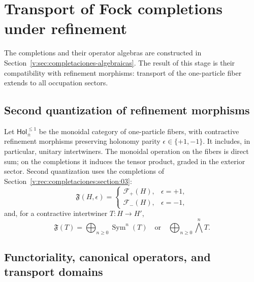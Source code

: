 \section{Transport of Fock completions under refinement}
\label{v:rec:fock_gibbs:section:01}

The completions and their operator algebras are constructed in
Section~\ref{v:sec:completaciones-algebraicas}. The result of this stage
is their compatibility with refinement morphisms: transport of
the one-particle fiber extends to all occupation sectors.

\subsection{Second quantization of refinement morphisms}
\label{v:rec:fock_gibbs:section:02}

Let \(\mathsf{Hol}_{\pm}^{\leq1}\) be the monoidal category of one-particle
fibers, with contractive refinement morphisms preserving
holonomy parity \(\epsilon\in\{+1,-1\}\). It includes, in particular,
unitary intertwiners. The monoidal operation on the fibers is
direct sum; on the completions it induces the tensor product,
graded in the exterior sector. Second quantization uses the
completions of Section~\ref{v:rec:completaciones:section:03}:
\[
 \mathfrak F(H,\epsilon)=
 \begin{cases}
 \mathcal F_+(H),
     &\epsilon=+1,\\[2mm]
 \mathcal F_-(H),
     &\epsilon=-1,
 \end{cases}
\]
and, for a contractive intertwiner \(T:H\to H'\),
\[
 \mathfrak F(T)=
 \bigoplus_{n\ge0}\operatorname{Sym}^n(T)
 \quad\text{or}\quad
 \bigoplus_{n\ge0}\bigwedge^n\!T.
\]

\subsection{Functoriality, canonical operators, and transport domains}
\label{v:rec:fock_gibbs:section:03}

